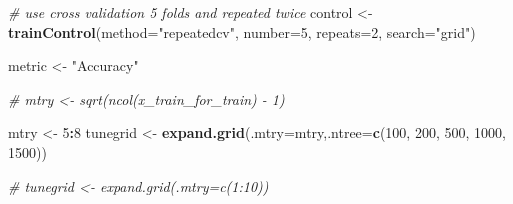 \documentclass[]{article}
\newenvironment{Shaded}{\begin{snugshade}}{\end{snugshade}}
\newcommand{\CommentTok}[1]{\textcolor[rgb]{0.56,0.35,0.01}{\textit{#1}}}
\newcommand{\DataTypeTok}[1]{\textcolor[rgb]{0.13,0.29,0.53}{#1}}
\newcommand{\DecValTok}[1]{\textcolor[rgb]{0.00,0.00,0.81}{#1}}
\newcommand{\KeywordTok}[1]{\textcolor[rgb]{0.13,0.29,0.53}{\textbf{#1}}}
\newcommand{\NormalTok}[1]{#1}
\newcommand{\OperatorTok}[1]{\textcolor[rgb]{0.81,0.36,0.00}{\textbf{#1}}}
\newcommand{\StringTok}[1]{\textcolor[rgb]{0.31,0.60,0.02}{#1}}
\begin{document}
\begin{Shaded}
\begin{Highlighting}[]
\CommentTok{# use cross validation 5 folds and repeated twice}
\NormalTok{control <-}\StringTok{ }\KeywordTok{trainControl}\NormalTok{(}\DataTypeTok{method=}\StringTok{"repeatedcv"}\NormalTok{, }\DataTypeTok{number=}\DecValTok{5}\NormalTok{, }\DataTypeTok{repeats=}\DecValTok{2}\NormalTok{, }\DataTypeTok{search=}\StringTok{"grid"}\NormalTok{)}

\NormalTok{metric <-}\StringTok{ "Accuracy"}

\CommentTok{# mtry <- sqrt(ncol(x_train_for_train) - 1)}

\NormalTok{mtry <-}\StringTok{ }\DecValTok{5}\OperatorTok{:}\DecValTok{8}
\NormalTok{tunegrid <-}\StringTok{ }\KeywordTok{expand.grid}\NormalTok{(}\DataTypeTok{.mtry=}\NormalTok{mtry,}\DataTypeTok{.ntree=}\KeywordTok{c}\NormalTok{(}\DecValTok{100}\NormalTok{, }\DecValTok{200}\NormalTok{, }\DecValTok{500}\NormalTok{, }\DecValTok{1000}\NormalTok{, }\DecValTok{1500}\NormalTok{))}

\CommentTok{# tunegrid <- expand.grid(.mtry=c(1:10))}


\end{Highlighting}
\end{Shaded}
\end{document}
